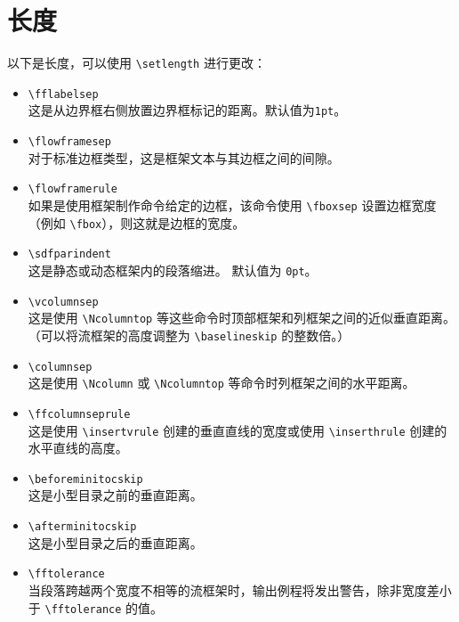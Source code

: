 \documentclass[a4paper]{book}%
\newcommand{\cmd}[1]{\texttt{#1}}
\begin{document}
\section{长度}%
以下是长度，可以使用 \verb|\setlength| 进行更改：
\begin{itemize}
    \item \verb|\fflabelsep|\\ 这是从边界框右侧放置边界框标记的距离。默认值为\cmd{1pt}。
    \item \verb|\flowframesep|\\ 对于标准边框类型，这是框架文本与其边框之间的间隙。
    \item \verb|\flowframerule|\\ 如果是使用框架制作命令给定的边框，该命令使用 \verb|\fboxsep| 设置边框宽度（例如 \verb|\fbox|），则这就是边框的宽度。
    \item \verb|\sdfparindent|\\ 这是静态或动态框架内的段落缩进。 默认值为 \cmd{0pt}。
    \item \verb|\vcolumnsep|\\ 这是使用 \verb|\Ncolumntop| 等这些命令时顶部框架和列框架之间的近似垂直距离。（可以将流框架的高度调整为 \verb|\baselineskip| 的整数倍。）
    \item \verb|\columnsep|\\ 这是使用 \verb|\Ncolumn| 或 \verb|\Ncolumntop| 等命令时列框架之间的水平距离。
    \item \verb|\ffcolumnseprule|\\ 这是使用 \verb|\insertvrule| 创建的垂直直线的宽度或使用 \verb|\inserthrule| 创建的水平直线的高度。
    \item \verb|\beforeminitocskip|\\ 这是小型目录之前的垂直距离。
    \item \verb|\afterminitocskip|\\ 这是小型目录之后的垂直距离。
    \item \verb|\fftolerance|\\ 当段落跨越两个宽度不相等的流框架时，输出例程将发出警告，除非宽度差小于 \verb|\fftolerance| 的值。
\end{itemize}
\end{document}
